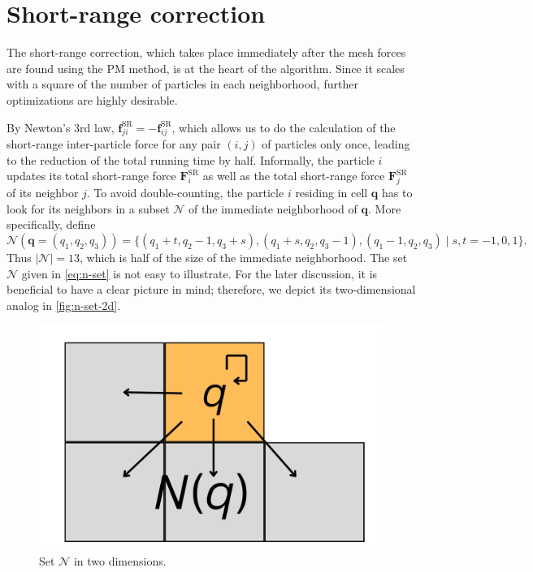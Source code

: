 \section{Short-range correction}
The short-range correction, which takes place immediately after the mesh forces are found using the PM method, is at the heart of the \PThreeM{} algorithm.
Since it scales with a square of the number of particles in each neighborhood, further optimizations are highly desirable.

By Newton's 3rd law, $\mathbf{f}^\text{SR}_{ji} = -\mathbf{f}^\text{SR}_{ij}$, which allows us to do the calculation of the short-range inter-particle force for any pair $(i, j)$ of particles only once, leading to the reduction of the total running time by half.
Informally, the particle $i$ updates its total short-range force $\mathbf{F}^\text{SR}_i$ as well as the total short-range force $\mathbf{F}^\text{SR}_j$ of its neighbor $j$.
To avoid double-counting, the particle $i$ residing in cell $\mathbf{q}$ has to look for its neighbors in a subset $\mathcal{N}$ of the immediate neighborhood of $\mathbf{q}$.
More specifically, define
\begin{equation}\label{eq:n-set}
    \mathcal{N}(\mathbf{q} = (q_1, q_2, q_3)) = \{(q_1+t, q_2-1,q_3+s), (q_1+s, q_2, q_3-1), (q_1-1,q_2,q_3) \;|\; s,t = -1,0,1 \}.
\end{equation}
Thus $|\mathcal{N}| = 13$, which is half of the size of the immediate neighborhood.
The set $\mathcal{N}$ given in \autoref{eq:n-set} is not easy to illustrate.
For the later discussion, it is beneficial to have a clear picture in mind; therefore, we depict its two-dimensional analog in \autoref{fig:n-set-2d}.
\begin{figure}[htp]
    \centering
    \includegraphics[scale=0.12]{chapters/p3m-method/img/q-neighborhood.png}
    \caption{Set $\mathcal{N}$ in two dimensions.}
    \label{fig:n-set-2d}
\end{figure}

